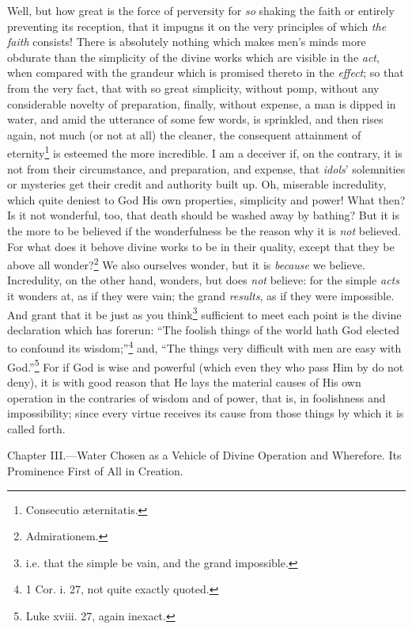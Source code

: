 Well, but how great is the force of perversity for \emph{so} shaking the faith or entirely preventing its reception, that it impugns it on the very principles of which \emph{the faith} consists! There is absolutely nothing which makes men’s minds more obdurate than the simplicity of the divine works which are visible in the \emph{act}, when compared with the grandeur which is promised thereto in the \emph{effect}; so that from the very fact, that with so great simplicity, without pomp, without any considerable novelty of preparation, finally, without expense, a man is dipped in water, and amid the utterance of some few words, is sprinkled, and then rises again, not much (or not at all) the cleaner, the consequent attainment of eternity\footnote{Consecutio æternitatis.} is esteemed the more incredible. I am a deceiver if, on the contrary, it is not from their circumstance, and preparation, and expense, that \emph{idols}’ solemnities or mysteries get their credit and authority built up. Oh, miserable incredulity, which quite deniest to God His own properties, simplicity and power! What then? Is it not wonderful, too, that death should be washed away by bathing? But it is the more to be believed if the wonderfulness be the reason why it is \emph{not} believed. For what does it behove divine works to be in their quality, except that they be above all wonder?\footnote{Admirationem.} We also ourselves wonder, but it is \emph{because} we believe. Incredulity, on the other hand, wonders, but does \emph{not} believe: for the simple \emph{acts} it wonders at, as if they were vain; the grand \emph{results}, as if they were impossible. And grant that it be just as you think\footnote{i.e. that the simple be vain, and the grand impossible.} sufficient to meet each point is the divine declaration which has forerun: “The foolish things of the world hath God elected to confound its wisdom;”\footnote{1 Cor. i. 27, not quite exactly quoted.} and, “The things very difficult with men are easy with God.”\footnote{Luke xviii. 27, again inexact.} For if God is wise and powerful (which even they who pass Him by do not deny), it is with good reason that He lays the material causes of His own operation in the contraries of wisdom and of power, that is, in foolishness and impossibility; since every virtue receives its cause from those things by which it is called forth.


Chapter III.—Water Chosen as a Vehicle of Divine Operation and Wherefore. Its Prominence First of All in Creation.

